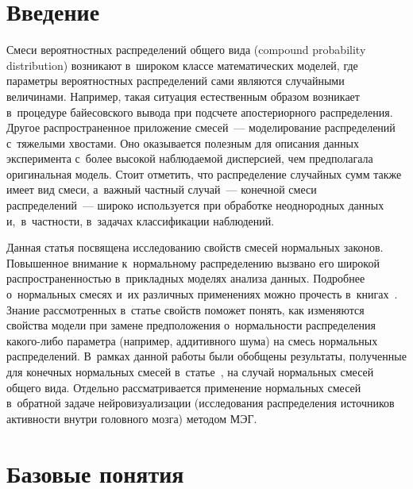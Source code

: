 \vspace*{-2pt}



\thispagestyle{headings}

\begin{multicols}{2}

\label{st\stat}

\section{Введение}

\vspace*{-1pt}

Смеси вероятностных распределений общего вида (compound probability distribution) 
возникают в~широком классе математических моделей, где параметры вероятностных распределений 
сами являются случайными величинами. Например, такая ситуация естественным образом возникает в~процедуре 
байесовского вывода при подсчете апостериорного распределения. Другое распространенное приложение смесей~--- 
моделирование распределений с~тяжелыми хвостами. Оно оказывается полезным для описания данных
 эксперимента с~более высокой наблюдаемой дисперсией, чем предполагала оригинальная модель. 
 Стоит отметить, что распределение случайных сумм также имеет вид смеси, а~важный частный случай~--- 
 конечной смеси распределений~--- широко используется при обработке неоднородных данных и,~в~част\-ности, 
 в~задачах классификации наблюдений.


Данная статья посвящена исследованию свойств смесей нормальных законов. Повышенное 
внимание к~нормальному распределению вызвано его широкой распространенностью в~прикладных моделях 
анализа данных. Подробнее о~нормальных смесях и~их различных применениях можно 
прочесть в~книгах~\cite{mac, tit}. Знание рассмотренных в~статье свойств поможет понять, 
как изменяются свойства модели при замене предположения о~нормальности распределения ка\-ко\-го-ли\-бо 
параметра (например, аддитивного шума) на смесь нормальных распределений. 
В~рамках данной работы были обобщены результаты, полученные для конечных нормальных 
смесей в~статье~\cite{simple_mix}, на случай нормальных смесей общего вида. 
Отдельно рассматривается применение нормальных смесей в~обратной задаче нейровизуализации 
(исследования распределения источников активности внутри головного мозга) методом МЭГ.

\vspace*{-3pt}

\section{Базовые понятия}


\end{multicols}
